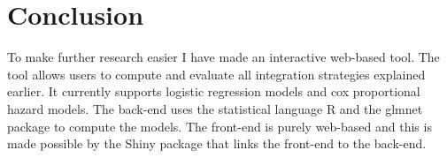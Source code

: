\section{Conclusion}
\label{sec:tool-conclusion}
To make further research easier I have made an interactive web-based tool. The tool allows users to compute and evaluate all integration strategies explained earlier. It currently supports logistic regression models and cox proportional hazard models. The back-end uses the statistical language R and the glmnet package to compute the models. The front-end is purely web-based and this is made possible by the Shiny package that links the front-end to the back-end.
